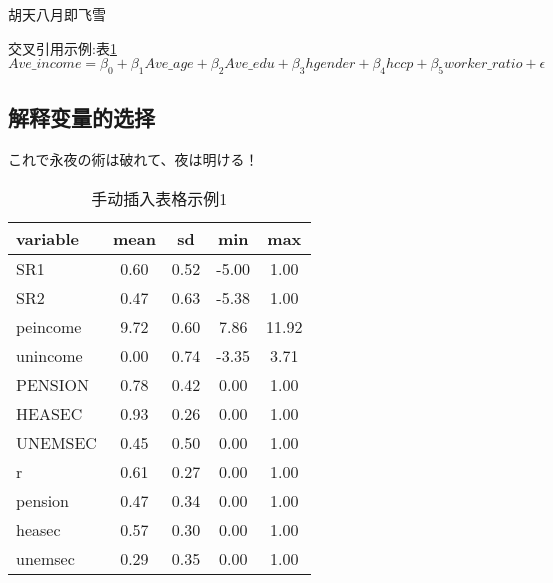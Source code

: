 胡天八月即飞雪

交叉引用示例:表\ref{hhh}
\[
    Ave\_income = \beta_0 + \beta_{1}Ave\_age + \beta_{2}Ave\_edu + \beta_{3}hgender + \beta_{4}hccp + \beta_{5}worker\_ratio + \epsilon
\]


\subsection{解释变量的选择}
これで永夜の術は破れて、夜は明ける！
\begin{table}
    
    \caption{手动插入表格示例1}
    \centering
    \begin{tabular}{lcccc}
        \toprule[1.5pt]
        variable & mean & sd   & min   & max   \\
        \midrule[1.0pt]
        SR1      & 0.60 & 0.52 & -5.00 & 1.00  \\
        SR2      & 0.47 & 0.63 & -5.38 & 1.00  \\
        peincome & 9.72 & 0.60 & 7.86  & 11.92 \\
        unincome & 0.00 & 0.74 & -3.35 & 3.71  \\
        PENSION  & 0.78 & 0.42 & 0.00  & 1.00  \\
        HEASEC   & 0.93 & 0.26 & 0.00  & 1.00  \\
        UNEMSEC  & 0.45 & 0.50 & 0.00  & 1.00  \\
        r        & 0.61 & 0.27 & 0.00  & 1.00  \\
        pension  & 0.47 & 0.34 & 0.00  & 1.00  \\
        heasec   & 0.57 & 0.30 & 0.00  & 1.00  \\
        unemsec  & 0.29 & 0.35 & 0.00  & 1.00  \\
        \bottomrule[1.5pt]
    \end{tabular}
    \label{hhh}
\end{table}
